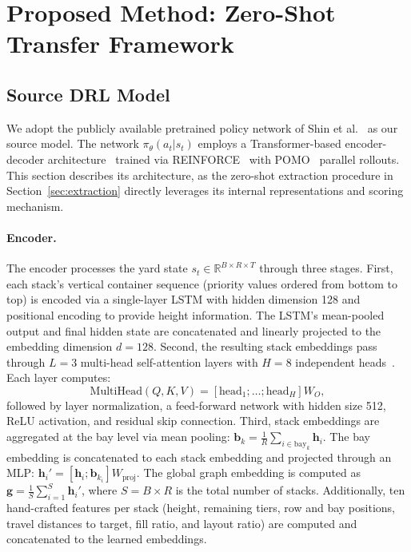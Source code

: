 \section{Proposed Method: Zero-Shot Transfer Framework}
\label{sec:method}

\subsection{Source DRL Model}

We adopt the publicly available pretrained policy network of Shin et al.~\cite{shin2026} as our source model. The network $\pi_\theta(a_t|s_t)$ employs a Transformer-based encoder-decoder architecture~\cite{vaswani2017} trained via REINFORCE~\cite{williams1992} with POMO~\cite{kwon2020} parallel rollouts. This section describes its architecture, as the zero-shot extraction procedure in Section~\ref{sec:extraction} directly leverages its internal representations and scoring mechanism.

\paragraph{Encoder.} The encoder processes the yard state $s_t \in \mathbb{R}^{B \times R \times T}$ through three stages. First, each stack's vertical container sequence (priority values ordered from bottom to top) is encoded via a single-layer LSTM with hidden dimension 128 and positional encoding to provide height information. The LSTM's mean-pooled output and final hidden state are concatenated and linearly projected to the embedding dimension $d = 128$. Second, the resulting stack embeddings pass through $L = 3$ multi-head self-attention layers with $H = 8$ independent heads~\cite{vaswani2017}. Each layer computes:
\begin{equation}
    \text{MultiHead}(Q,K,V) = [\text{head}_1; \dots; \text{head}_H]W_O,
\end{equation}
followed by layer normalization, a feed-forward network with hidden size 512, ReLU activation, and residual skip connection. Third, stack embeddings are aggregated at the bay level via mean pooling: $\mathbf{b}_k = \frac{1}{R} \sum_{i \in \text{bay}_k} \mathbf{h}_i$. The bay embedding is concatenated to each stack embedding and projected through an MLP: $\mathbf{h}_i' = [\mathbf{h}_i; \mathbf{b}_{k_i}] W_{\text{proj}}$. The global graph embedding is computed as $\mathbf{g} = \frac{1}{S} \sum_{i=1}^{S} \mathbf{h}_i'$, where $S = B \times R$ is the total number of stacks. Additionally, ten hand-crafted features per stack (height, remaining tiers, row and bay positions, travel distances to target, fill ratio, and layout ratio) are computed and concatenated to the learned embeddings.

